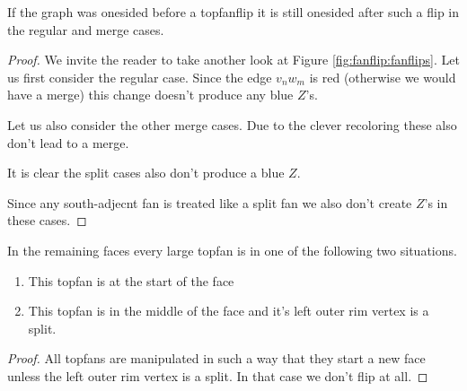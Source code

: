 \begin{lemma}
  \label{lm:topfan:oneSidedREL}
  If the graph was onesided before a topfanflip it is still onesided after such a flip in the regular and merge cases.
\end{lemma}
\begin{proof}
  We invite the reader to take another look at Figure \ref{fig:fanflip:fanflips}.
  Let us first consider the regular case. Since the edge  $v_n w_m$ is red (otherwise we would have a merge) this change doesn't produce any blue $Z$'s.

  Let us also consider the other merge cases. Due to the clever recoloring these also don't lead to a merge.

  It is clear the split cases also don't produce a blue $Z$.

  Since any south-adjecnt fan is treated like a split fan we also don't create $Z$'s  in these cases.
\end{proof}


\begin{lemma}
  \label{lm:topfan:remainingTopfans}
  In the remaining faces every large topfan is in one of the following two situations.
  \begin{enumerate}
    \item  This topfan is at the start of the face
    \item  This topfan is in the middle of the face and it's left outer rim vertex is a split.
  \end{enumerate}
\end{lemma}
\begin{proof}
  All topfans are manipulated in such a way that they start a new face unless the left outer rim vertex is a split. In that case we don't flip at all.
\end{proof}
